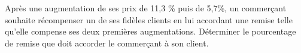 
Après une augmentation de ses prix de 11,3 \% puis de 5,7\%, un commerçant souhaite récompenser un de ses fidèles clients en lui accordant une remise telle qu'elle compense ses deux premières augmentations. Déterminer le pourcentage de remise que doit accorder le commerçant à son client. 